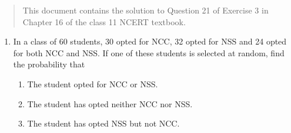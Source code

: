 \documentclass[journal,12pt,twocolumn]{IEEEtran}
\begin{document}
\begin{abstract}
    This document contains the solution to Question 21 of 
    Exercise 3 in Chapter 16 of the class 11 NCERT textbook.
\end{abstract}

\begin{enumerate}
    \item In a class of 60 students, 30 opted for NCC, 32 opted for NSS and 24 
    opted for both NCC and NSS. If one of these students is selected at random, 
    find the probability that
    \begin{enumerate}
        \item The student opted for NCC or NSS.
        \item The student has opted neither NCC nor NSS.
        \item The student has opted NSS but not NCC.
    \end{enumerate}


\end{enumerate}
\end{document}
